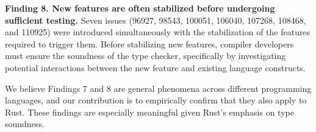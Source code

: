 %

{\bf Finding 8. New features are often stabilized before undergoing sufficient
testing.}
%
Seven issues (96927, 98543, 100051, 106040, 107268, 108468, and 110925) were
introduced simultaneously with the stabilization of the features required to
trigger them.
%
Before stabilizing new features, compiler developers must ensure the soundness
of the type checker, specifically by investigating potential interactions
between the new feature and existing language constructs.

We believe Findings 7 and 8 are general phenomena across different programming
languages, and our contribution is to empirically confirm that they also apply
to Rust.
%
These findings are especially meaningful given Rust's emphasis on type
soundness.

%
